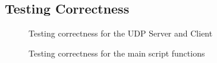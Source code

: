 \begin{appendices}
%
\chapter{Testing Correctness}
\begin{center}
	\label{ref:testingCorrect}
	
	\begin{figure}[h]
		\caption{Testing correctness for the UDP Server and Client}
		\label{ref:testingUDP}
	\end{figure}
	
		
	\begin{figure}[h]
		\caption{Testing correctness for the main script functions}	
		\label{ref:testingScript}
	\end{figure}
\end{center}
\end{appendices}
